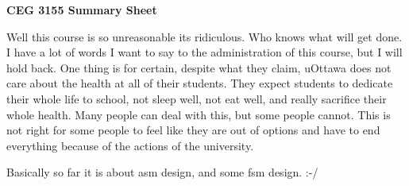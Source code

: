 \documentclass[12pt,letterpaper]{article} \usepackage{amsmath} \usepackage{graphicx} \usepackage[margin=1in]{geometry} \usepackage{longtable}  \usepackage{amssymb}
\begin{document}
	
	\begin{center}
		\Large\textbf{CEG 3155 Summary Sheet} \\
		\vspace{0.5em}
	\end{center}	

	Well this course is so unreasonable its ridiculous. Who knows what will get done. I have a lot of words I want to say to the administration of this course, but I will hold back. One thing is for certain, despite what they claim, uOttawa does not care about the health at all of their students. They expect students to dedicate their whole life to school, not sleep well, not eat well, and really sacrifice their whole health. Many people can deal with this, but some people cannot. This is not right for some people to feel like they are out of options and have to end everything because of the actions of the university. 
	
	Basically so far it is about asm design, and some fsm design. :-/
	
	
	
	
\end{document}
